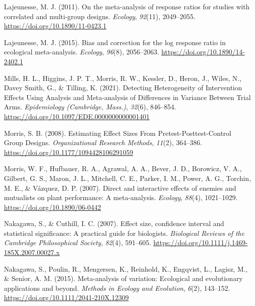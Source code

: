 \documentclass[
]{article}
\newlength{\cslhangindent}
\newlength{\cslentryspacingunit} %
\newenvironment{CSLReferences}[2] %
 {%
  \setlength{\parindent}{0pt}
  \ifodd #1
  \let\oldpar\par
  \def\par{\hangindent=\cslhangindent\oldpar}
  \fi
  \setlength{\parskip}{#2\cslentryspacingunit}
 }%
 {}
\begin{document}
\begin{CSLReferences}{1}{0}
\leavevmode{}%
Lajeunesse, M. J. (2011). On the meta-analysis of response ratios for studies with correlated and multi-group designs. \emph{Ecology}, \emph{92}(11), 2049--2055. \url{https://doi.org/10.1890/11-0423.1}

\leavevmode{}%
Lajeunesse, M. J. (2015). Bias and correction for the log response ratio in ecological meta-analysis. \emph{Ecology}, \emph{96}(8), 2056--2063. \url{https://doi.org/10.1890/14-2402.1}

\leavevmode{}%
Mills, H. L., Higgins, J. P. T., Morris, R. W., Kessler, D., Heron, J., Wiles, N., Davey Smith, G., \& Tilling, K. (2021). Detecting {Heterogeneity} of {Intervention} {Effects} {Using} {Analysis} and {Meta}-analysis of {Differences} in {Variance} {Between} {Trial} {Arms}. \emph{Epidemiology (Cambridge, Mass.)}, \emph{32}(6), 846--854. \url{https://doi.org/10.1097/EDE.0000000000001401}

\leavevmode{}%
Morris, S. B. (2008). Estimating {Effect} {Sizes} {From} {Pretest}-{Posttest}-{Control} {Group} {Designs}. \emph{Organizational Research Methods}, \emph{11}(2), 364--386. \url{https://doi.org/10.1177/1094428106291059}

\leavevmode{}%
Morris, W. F., Hufbauer, R. A., Agrawal, A. A., Bever, J. D., Borowicz, V. A., Gilbert, G. S., Maron, J. L., Mitchell, C. E., Parker, I. M., Power, A. G., Torchin, M. E., \& Vázquez, D. P. (2007). Direct and interactive effects of enemies and mutualists on plant performance: A meta-analysis. \emph{Ecology}, \emph{88}(4), 1021--1029. \url{https://doi.org/10.1890/06-0442}

\leavevmode{}%
Nakagawa, S., \& Cuthill, I. C. (2007). Effect size, confidence interval and statistical significance: A practical guide for biologists. \emph{Biological Reviews of the Cambridge Philosophical Society}, \emph{82}(4), 591--605. \url{https://doi.org/10.1111/j.1469-185X.2007.00027.x}

\leavevmode{}%
Nakagawa, S., Poulin, R., Mengersen, K., Reinhold, K., Engqvist, L., Lagisz, M., \& Senior, A. M. (2015). Meta-analysis of variation: Ecological and evolutionary applications and beyond. \emph{Methods in Ecology and Evolution}, \emph{6}(2), 143--152. \url{https://doi.org/10.1111/2041-210X.12309}


\end{CSLReferences}
\end{document}

